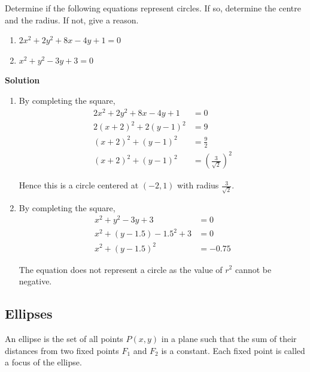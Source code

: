 \documentclass[11pt,a4paper]{book}
\begin{document}
\newpage

\begin{example}{}
Determine if the following equations represent circles. If so, determine
the centre and the radius. If not, give a reason.

\begin{enumerate}[label=(\alph*)]

\item  $2x^{2}+2y^{2}+8x-4y+1=0$

\item  $x^{2}+y^{2}-3y+3=0$

\end{enumerate}

\textbf{Solution}

\begin{enumerate}[label=(\alph*)]

\item By completing the square,
\begin{align*}
2x^{2}+2y^{2}+8x-4y+1 & =0\\
2\left(x+2\right)^{2}+2\left(y-1\right)^{2} & =9\\
\left(x+2\right)^{2}+\left(y-1\right)^{2} & =\frac{9}{2}\\
\left(x+2\right)^{2}+\left(y-1\right)^{2} & =\left(\frac{3}{\sqrt{2}}\right)^{2}
\end{align*}

Hence this is a circle centered at $\left(-2,1\right)$
with radius ${\displaystyle \frac{3}{\sqrt{2}}}$.

\item  By completing the square,
\begin{align*}
x^{2}+y^{2}-3y+3 & =0\\
x^{2}+\left(y-1.5\right)-1.5^{2}+3 & =0\\
x^{2}+\left(y-1.5\right)^{2} & =-0.75
\end{align*}

The equation does not represent a circle as the value of $r^{2}$
cannot be negative.

\end{enumerate}

\end{example}


\subsection{Ellipses}

An ellipse is the set of all points $P(x,y)$ in a plane such that
the sum of their distances from two fixed points $F_{1}$ and $F_{2}$
is a constant. Each fixed point is called a focus of the ellipse.
\end{document}
